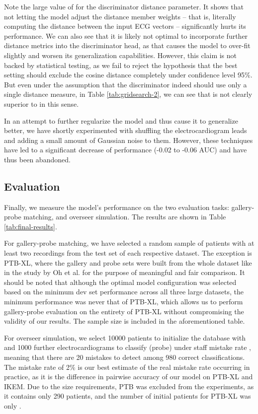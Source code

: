 \documentclass[preprint,12pt]{elsarticle}
\begin{document}
Note the large value of  for the discriminator  distance parameter. It shows that not letting the model adjust the distance member weights -- that is, literally computing the distance between the input ECG vectors -- significantly hurts its performance. We can also see that it is likely not optimal to incorporate further distance metrics into the discriminator head, as that causes the model to over-fit slightly and worsen its generalization capabilities. However, this claim is not backed by statistical testing, as we fail to reject the hypothesis that the best setting should exclude the cosine distance completely under confidence level 95\%. But even under the assumption that the discriminator indeed should use only a single distance measure, in Table \ref{tab:gridsearch-2}, we can see that  is not clearly superior to  in this sense.

In an attempt to further regularize the model and thus cause it to generalize better, we have shortly experimented with shuffling the electrocardiogram leads and adding a small amount of Gaussian noise to them. However, these techniques have led to a significant decrease of performance (-0.02 to -0.06 AUC) and have thus been abandoned.





\subsection{Evaluation}

Finally, we measure the model's performance on the two evaluation tasks: gallery-probe matching, and overseer simulation. The results are shown in Table \ref{tab:final-results}. 

For gallery-probe matching, we have selected a random sample of patients with at least two recordings from the test set of each respective dataset. The exception is PTB-XL, where the gallery and probe sets were built from the whole dataset like in the study by Oh et al. \cite{oh2022lead} for the purpose of meaningful and fair comparison. It should be noted that although the optimal model configuration was selected based on the minimum dev set performance across all three large datasets, the minimum performance was never that of PTB-XL, which allows us to perform gallery-probe evaluation on the entirety of PTB-XL without compromising the validity of our results. The sample size is included in the aforementioned table. 

For overseer simulation, we select 10000 patients to initialize the database with and 1000 further electrocardiograms to classify (probe) under staff mistake rate , meaning that there are 20 mistakes to detect among 980 correct classifications. The mistake rate of 2\% is our best estimate of the real mistake rate occurring in practice, as it is the difference in pairwise accuracy of our model on PTB-XL and IKEM. Due to the size requirements, PTB was excluded from the experiments, as it contains only 290 patients, and the number of initial patients for PTB-XL was only . 
\end{document}
